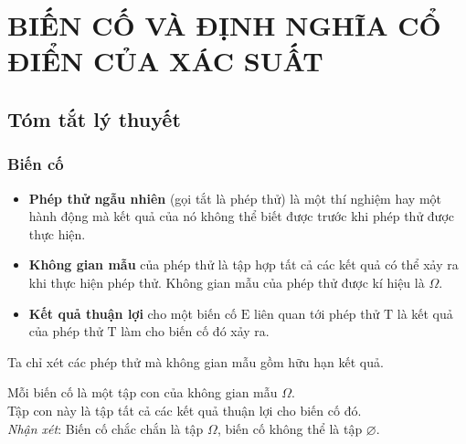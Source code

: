 \setcounter{section}{4}
\setcounter{dang}{0}
\section*{BIẾN CỐ VÀ ĐỊNH NGHĨA CỔ ĐIỂN CỦA XÁC SUẤT}
\subsection{Tóm tắt lý thuyết}
\subsubsection{Biến cố}
\begin{boxdn}
\begin{itemize}
	\item {\bf{Phép thử ngẫu nhiên}} (gọi tắt là phép thử) là một thí nghiệm hay một hành động mà kết quả của nó không thể biết được trước khi phép thử được thực hiện.
	\item {\bf{Không gian mẫu}} của phép thử là tập hợp tất cả  các kết quả có thể xảy ra khi thực hiện phép thử. Không gian mẫu của phép thử được kí hiệu là $ \Omega $.
	\item {\bf{Kết quả thuận lợi}} cho một biến cố $ \mathrm{E} $ liên quan tới phép thử $ \mathrm{T} $ là kết quả của phép thử $ \mathrm{T} $ làm cho biến cố  đó xảy ra.
\end{itemize}
\end{boxdn}
\begin{note}
	Ta chỉ xét các phép thử mà không gian mẫu gồm hữu hạn kết quả.
\end{note} 
Mỗi biến cố là một tập con của không gian mẫu $ \Omega $. \\
Tập con này  là tập tất cả các kết quả thuận lợi cho biến cố đó.\\
\textit{Nhận xét}: Biến cố chắc chắn là tập $ \Omega $, biến cố không thể là tập $ \varnothing $.
